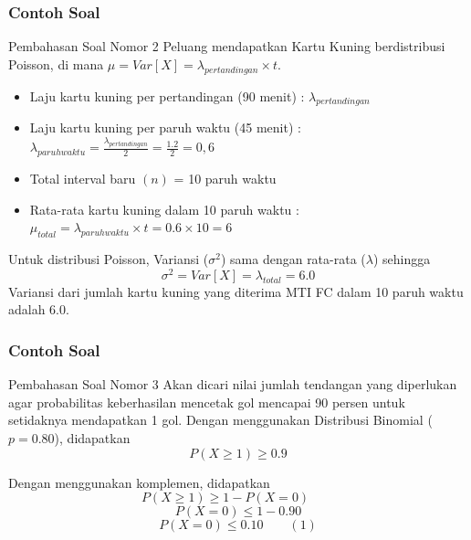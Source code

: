 \documentclass[]{beamer}
\begin{document}
\begin{frame}
    \frametitle{Contoh Soal}
    \scriptsize
    \begin{exampleblock}{Pembahasan Soal Nomor 2}
        Peluang mendapatkan Kartu Kuning berdistribusi Poisson, di mana $\mu = Var[X] = \lambda_{pertandingan} \times t$. 
        \begin{itemize}
            \item Laju kartu kuning per pertandingan (90 menit) : $\lambda_{pertandingan}$
            \item Laju kartu kuning per paruh waktu (45 menit) : $\lambda_{paruh waktu}=\frac{\lambda_{pertandingan}}{2} = \frac{1.2}{2} = 0,6$
            \item Total interval baru $(n)$ = 10 paruh waktu
            \item Rata-rata kartu kuning dalam 10 paruh waktu : $\mu_{total}=\lambda_{paruh waktu} \times t = 0.6 \times 10 = 6$
        \end{itemize}
        Untuk distribusi Poisson, Variansi ($\sigma^2$) sama dengan rata-rata ($\lambda$) sehingga
        \begin{equation*}
            \sigma^2 = Var[X] = \lambda_{total} = \mathbf{6.0}
        \end{equation*}
        Variansi dari jumlah kartu kuning yang diterima MTI FC dalam 10 paruh waktu adalah 6.0.
    \end{exampleblock}
\end{frame}

\begin{frame}
    \frametitle{Contoh Soal}
    \scriptsize
    \begin{exampleblock}{Pembahasan Soal Nomor 3}
    Akan dicari nilai jumlah tendangan yang diperlukan agar probabilitas keberhasilan mencetak gol mencapai 90 persen untuk setidaknya mendapatkan 1 gol.
    Dengan menggunakan Distribusi Binomial ($p=0.80$), didapatkan
    \begin{equation*}
        P(X\ge1) \ge 0.9
    \end{equation*}

    \bigskip
    Dengan menggunakan komplemen, didapatkan
     \begin{equation*}
         P(X\ge1) \ge 1-P(X=0) \qquad
     \end{equation*}
     \begin{equation*}
         P(X = 0) \le 1 - 0.90
     \end{equation*}
     \begin{equation*}
         P(X = 0) \le 0.10 \qquad (1)
     \end{equation*}
    \end{exampleblock}
\end{frame}
\end{document}
